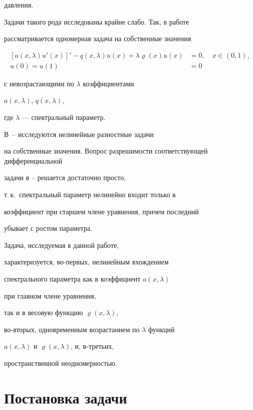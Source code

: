 давления.





Задачи такого рода исследованы крайне слабо. Так, в работе \cite{Gul1} 


рассматривается одномерная задача на собственные значения 


\begin{align*}


[a (x, \lambda ) u ' (x)]'


-q(x, \lambda)u (x) + \lambda \varrho(x) u(x) &= 0, \quad x \in (0, 1), \\


u(0)=u(1)&=0


\end{align*}


с невозрастающими по $\lambda$ коэффициентами


$a (x, \lambda )$, $q(x, \lambda)$, 


где $ \lambda$ --- спектральный параметр. 


В~\cite{Gul2}--\cite{Gul4} исследуются нелинейные разностные задачи


на собственные значения. Вопрос разрешимости соответствующей дифференциальной 


задачи в \cite{Gul1}--\cite{Gul4} решается достаточно просто,


т.\,к.~спектральный параметр нелинейно входит только в


коэффициент при старшем члене уравнения, причем последний 


убывает с ростом параметра.





Задача, исследуемая в данной работе,


характеризуется, во-первых, нелинейным вхождением 


спектрального параметра как в коэффициент $a(x, \lambda )$


при главном члене уравнения, 


так и в весовую функцию $\varrho(x, \lambda)$,


во-вторых, одновременным возрастанием по $ \lambda$ функций 


$a (x, \lambda )$ и $\varrho(x, \lambda)$, и, в-третьих,


пространственной неодномерностью. 


 


\section{Постановка задачи}





